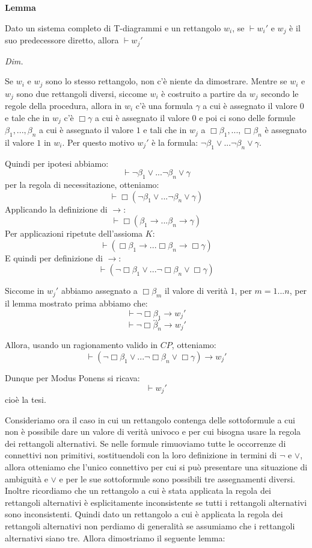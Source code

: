 \documentclass[a4paper, 12pt]{article}
\begin{document}
\begin{flushleft}
\textbf{Lemma}

Dato un sistema completo di T-diagrammi e un rettangolo $w_i$, se $\vdash w_i'$
e $w_j$ è il suo predecessore diretto,
allora $\vdash w_j'$

\textit{Dim.}

Se $w_i$ e $w_j$ sono lo stesso rettangolo, non c'è niente da dimostrare.
Mentre se $w_i$ e $w_j$ sono due rettangoli diversi, siccome $w_i$ è costruito
a partire da $w_j$ secondo le regole della procedura, allora in $w_i$ c'è
una formula $\gamma$ a cui è assegnato il valore $0$ e tale che in $w_j$ c'è
$\Box \gamma$ a cui è assegnato il valore $0$ e poi ci sono delle formule
$\beta_1, ..., \beta_n$ a cui è assegnato il valore $1$ e tali che in $w_j$
a $\Box \beta_1, ..., \Box \beta_n$ è assegnato il valore $1$ in $w_i$.
Per questo motivo $w_j'$ è la formula: $\neg \beta_1 \lor ... \neg \beta_n \lor \gamma$.

Quindi per ipotesi abbiamo:
$$\vdash \neg \beta_1 \lor ... \neg \beta_n \lor \gamma$$
per la regola di necessitazione, otteniamo:
$$\vdash \Box(\neg \beta_1 \lor ... \neg \beta_n \lor \gamma)$$
Applicando la definizione di $\rightarrow$:
$$\vdash \Box(\beta_1 \rightarrow ... \beta_n \rightarrow \gamma)$$
Per applicazioni ripetute dell'assioma $K$:
$$\vdash (\Box \beta_1 \rightarrow ... \Box \beta_n \rightarrow \Box \gamma)$$
E quindi per definizione di $\rightarrow$:
$$\vdash (\neg \Box \beta_1 \lor ... \neg \Box \beta_n \lor \Box \gamma)$$

Siccome in $w_j'$ abbiamo assegnato a $\Box \beta_m$ il valore di verità $1$, per $m = 1...n$,
per il lemma mostrato prima abbiamo che:
$$\vdash \neg \Box \beta_1 \rightarrow w_j'$$
$$...$$
$$\vdash \neg \Box \beta_n \rightarrow w_j'$$

Allora, usando un ragionamento valido in $CP$, otteniamo:
$$\vdash (\neg \Box \beta_1 \lor ... \neg \Box \beta_n \lor \Box \gamma) \rightarrow w_j'$$

Dunque per Modus Ponens si ricava:
$$\vdash w_j'$$
cioè la tesi.

\end{flushleft}

Consideriamo ora il caso in cui un rettangolo contenga delle sottoformule
a cui non è possibile dare un valore di verità univoco e per cui bisogna
usare la regola dei rettangoli alternativi. Se nelle formule rimuoviamo
tutte le occorrenze di connettivi non primitivi, sostituendoli con la loro definizione
in termini di $\neg$ e $\lor$, allora otteniamo che l'unico connettivo
per cui si può presentare una situazione di ambiguità e $\lor$ e per le sue sottoformule
sono possibili tre assegnamenti diversi. Inoltre ricordiamo che un rettangolo a cui è stata applicata
la regola dei rettangoli alternativi è esplicitamente inconsistente se tutti i
rettangoli alternativi sono inconsistenti. Quindi dato un rettangolo
a cui è applicata la regola dei rettangoli alternativi non perdiamo di generalità
se assumiamo che i rettangoli alternativi siano tre. Allora dimostriamo il seguente lemma:
\end{document}
